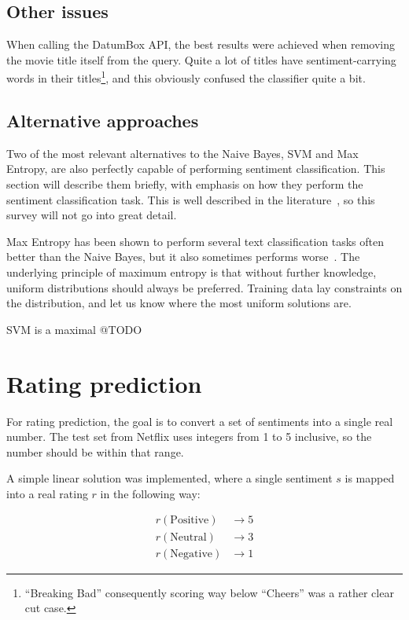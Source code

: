 \subsection{Other issues}

When calling the DatumBox API, the best results were achieved when removing the movie title itself from the query. Quite a lot of titles have sentiment-carrying words in their titles\footnote{``Breaking Bad'' consequently scoring way below ``Cheers'' was a rather clear cut case.}, and this obviously confused the classifier quite a bit.


\subsection{Alternative approaches}

Two of the most relevant alternatives to the Naive Bayes, SVM and Max Entropy, are also perfectly capable of performing sentiment classification. This section will describe them briefly, with emphasis on how they perform the sentiment classification task. This is well described in the literature~\cite{pang2002thumbs}, so this survey will not go into great detail.

Max Entropy has been shown to perform several text classification tasks often better than the Naive Bayes, but it also sometimes performs worse~\cite{Nigam99usingmaximum}. The underlying principle of maximum entropy is that without further knowledge, uniform distributions should always be preferred. Training data lay constraints on the distribution, and let us know where the most uniform solutions are.

SVM is a maximal @TODO


\section{Rating prediction} %
\label{sec:rating_prediction}

For rating prediction, the goal is to convert a set of sentiments into a single real number. The test set from Netflix uses integers from 1 to 5 inclusive, so the number should be within that range.

A simple linear solution was implemented, where a single sentiment $s$ is mapped into a real rating $r$ in the following way:

\begin{align*}
  r(\text{Positive}) &\rightarrow 5 \\
  r(\text{Neutral})  &\rightarrow 3 \\
  r(\text{Negative}) &\rightarrow 1
\end{align*}

